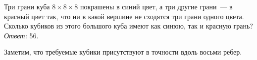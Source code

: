 \problem
Три грани куба $8 \times 8 \times 8$ покрашены в синий цвет, а три другие
грани~--- в красный цвет так, что ни в какой вершине не сходятся три грани
одного цвета.
Сколько кубиков из этого большого куба имеют как синюю, так и красную грань?
\solution
\emph{Ответ:} 56.
\par
Заметим, что требуемые кубики присутствуют в точности вдоль восьми ребер.
\endproblem
